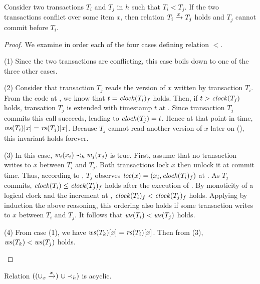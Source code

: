 \begin{proposition}
  Consider two transactions $T_i$ and $T_j$ in $h$ such that $T_i < T_j$.
  If the two transactions conflict over some item $x$, then relation $T_i \stmPrec{x} T_j$ holds and $T_j$ cannot commit before $T_i$.
\end{proposition}

\begin{proof}  
  We examine in order each of the four cases defining relation $<$.
  \begin{compactitem}
  \item[(1)]
    Since the two transactions are conflicting, this case boils down to one of the three other cases.
  \item[(2)]
    Consider that transaction $T_j$ reads the version of $x$ written by transaction $T_i$.
    From the code at , we know that $t=\clockOf{T_i}_f$ holds.
    Then, if $t > \clockOf{T_j}$ holds, transation $T_j$ is extended with timestamp $t$ at .
    Since transaction $T_j$ commits this call succeeds, leading to $\clockOf{T_j} = t$.
    Hence at that point in time, $\writeSetOf{T_i}[x] = \readSetOf{T_j}[x]$.
    Because $T_j$ cannot read another version of $x$ later on (), this invariant holds forever.
  \item[(3)]
    In this case, $w_i(x_i) \hb_h w_j(x_j)$ is true.
    First, assume that no transaction writes to $x$ between $T_i$ and $T_j$.
    Both transactions lock $x$ then unlock it at commit time.
    Thus, according to , $T_j$ observes $\locationOf{x}=(x_i,\clockOf{T_i}_f)$ at .
    As $T_j$ commits, $\clockOf{T_i} \leq \clockOf{T_j}_f$ holds after the execution of .
    By monoticity of a logical clock and the increment at , $\clockOf{T_i}_f < \clockOf{T_j}_f$ holds.
    Applying by induction the above reasoning, this ordering also holds if some transaction writes to $x$ between $T_i$ and $T_j$.
    It follows that $\writeSetOf{T_i} < \writeSetOf{T_j}$ holds.
  \item[(4)]
    From case (1), we have $\writeSetOf{T_k}[x] = \readSetOf{T_i}[x]$.
    Then from (3), $\writeSetOf{T_k} < \writeSetOf{T_j}$ holds.
  \end{compactitem}
  
\end{proof}

\begin{proposition}  
  Relation $((\union_{x} \stmPrec{x}) ~\union \hb_h)$ is acyclic.
\end{proposition}

